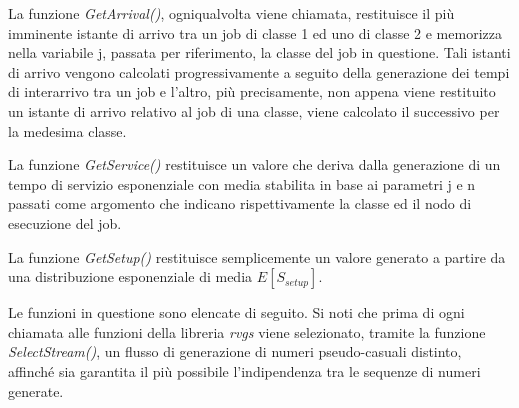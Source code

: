 La funzione \emph{GetArrival()}, ogniqualvolta viene chiamata, restituisce il
più imminente istante di arrivo tra un job di classe 1 ed uno di classe 2 e
memorizza nella variabile j, passata per riferimento, la classe del job in
questione. Tali istanti di arrivo vengono calcolati progressivamente a seguito
della generazione dei tempi di interarrivo tra un job e l’altro, più
precisamente, non appena viene restituito un istante di arrivo relativo al job
di una classe, viene calcolato il successivo per la medesima classe.

La funzione \emph{GetService()} restituisce un valore che deriva dalla
generazione di un tempo di servizio esponenziale con media stabilita in base ai
parametri j e n passati come argomento che indicano rispettivamente la classe ed
il nodo di esecuzione del job.

La funzione \emph{GetSetup()} restituisce semplicemente un valore generato a
partire da una distribuzione esponenziale di media $E[S_{setup}]$.

Le funzioni in questione sono elencate di seguito. Si noti che prima di ogni
chiamata alle funzioni della libreria \emph{rvgs} viene selezionato, tramite la
funzione \emph{SelectStream()}, un flusso di generazione di numeri
pseudo-casuali distinto, affinché sia garantita il più possibile l’indipendenza
tra le sequenze di numeri generate.  
%
%
